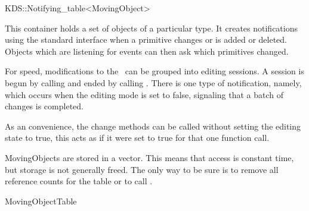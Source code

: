 

\begin{ccRefClass}{KDS::Notifying_table<MovingObject>}  %


\ccDefinition
  

This container holds a set of objects of a particular type. It creates
notifications using the standard  interface when a
primitive changes or is added or deleted. Objects which are listening
for events can then ask which primitives changed.

For speed, modifications to the \ccRefName\ can be grouped into
editing sessions. A session is begun by calling
 and ended by calling .
There is one type of notification, namely, 
which occurs when the editing mode is set to false, signaling that a
batch of changes is completed.

As an convenience, the change methods can be called without setting
the editing state to true, this acts as if it were set to true for
that one function call.

MovingObjects are stored in a vector. This means that access is constant
time, but storage is not generally freed. The only way to be sure is
to remove all reference counts for the table or to call .



\ccIsModel

MovingObjectTable

\ccTypes





\end{ccRefClass}
